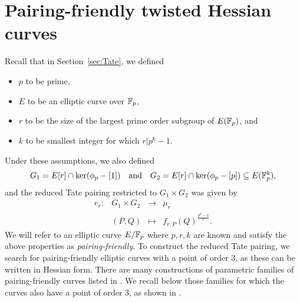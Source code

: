 \section{Pairing-friendly twisted Hessian curves}
\label{sec:curves}

Recall that in Section~\ref{sec:Tate}, we defined
\begin{itemize}
\item $p$ to be prime,
\item $E$ to be an elliptic curve over $\mathbb{F}_{p}$,
\item $r$ to be the size of the largest prime order subgroup of $E(\mathbb{F}_{p})$, and
\item $k$ to be smallest integer for which $r | p^{k}-1$.
\end{itemize}
Under these assumptions, we also defined 
\[\begin{array}{ccc}
G_{1} = E[r] \cap \ker(\phi_{p} - [1]) & \text{and} & G_{2} = E[r] \cap \ker(\phi_{p} - [p]) \subseteq E(\mathbb{F}_{p}^{k}),
\end{array}\]
and the reduced Tate pairing restricted to $G_{1} \times G_{2}$ was given by
\[\begin{array}{rccc}
e_{r}:& G_{1} \times G_{2} & \longrightarrow & \mu_{r} \\
& (P,Q) & \mapsto & f_{r,P}(Q)^{\frac{p^{k}-1}{r}}.
\end{array}\]
We will refer to an elliptic curve $E/\mathbb{F}_{p}$ where $p,r,k$ are known and satisfy the above properties as \emph{pairing-friendly}. To construct the reduced Tate pairing, we search for pairing-friendly elliptic curves with a point of order 3, as these can be written in Hessian form. There are many constructions of parametric families of pairing-friendly curves listed in \cite{2010/freeman}. We recall below those families for which the curves also have a point of order 3, as shown in \cite[Section 5]{2015/hessian}.



